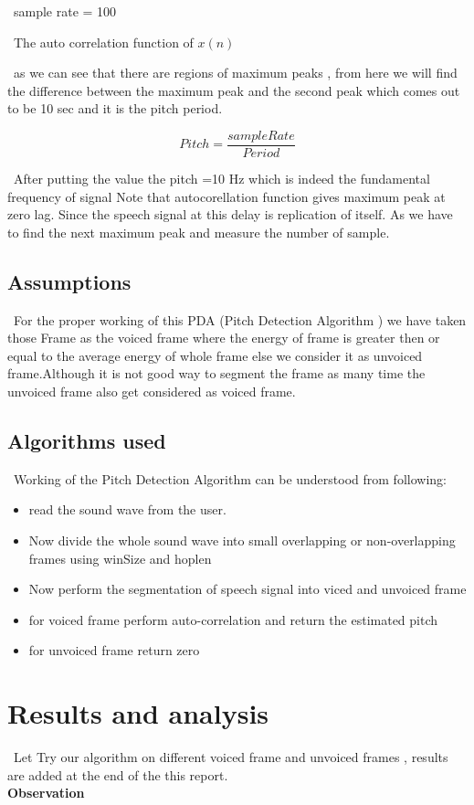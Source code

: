 \documentclass[11pt,a4paper]{report}
\begin{document}
\ sample rate = 100

\ The auto correlation function of $x(n)$ 


\ as we can see that there are regions of maximum peaks , from here we will find the difference between the maximum peak and the second peak which comes out to be 10 sec and it is the pitch period.

\begin{equation} Pitch =  \frac{sample Rate}{Period}   \end{equation}

\ After putting the value the pitch =10 Hz which is indeed the fundamental frequency of signal
Note that autocorellation function gives maximum peak at zero lag. Since the speech signal at this delay is replication of itself. As we have to find the next maximum peak and measure the number of sample.
\subsection{Assumptions}

\ For the proper working of this PDA (Pitch Detection Algorithm ) we have taken those Frame as the voiced frame where the energy of frame is greater then or equal to the average energy of whole frame else we consider it as unvoiced frame.Although it is not good way to segment the frame as many time the unvoiced frame also get considered as voiced frame. 
\subsection{Algorithms used}

\ Working of the Pitch Detection Algorithm can be understood from following:

\begin{itemize}
  \item read the sound wave from the user.
  \item Now divide the whole sound wave into small overlapping or non-overlapping frames using winSize and hoplen
  \item Now perform the segmentation of speech signal into viced and unvoiced frame
  \item for voiced frame perform auto-correlation and return the estimated pitch
  \item for unvoiced frame return zero
\end{itemize}

\section{Results and analysis}
\ Let Try our algorithm on different voiced frame and unvoiced frames , results are added at the end of the this report.
\\ \textbf{Observation}
\end{document}
